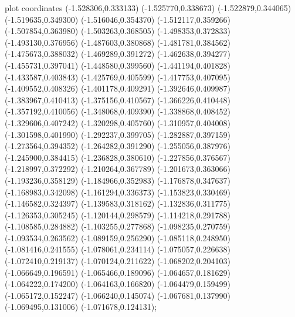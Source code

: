 { plot coordinates {(-1.528306,0.333133) (-1.525770,0.338673) (-1.522879,0.344065) (-1.519635,0.349300) (-1.516046,0.354370) (-1.512117,0.359266) (-1.507854,0.363980) (-1.503263,0.368505) (-1.498353,0.372833) (-1.493130,0.376956) (-1.487603,0.380868) (-1.481781,0.384562) (-1.475673,0.388032) (-1.469289,0.391272) (-1.462638,0.394277) (-1.455731,0.397041) (-1.448580,0.399560) (-1.441194,0.401828) (-1.433587,0.403843) (-1.425769,0.405599) (-1.417753,0.407095) (-1.409552,0.408326) (-1.401178,0.409291) (-1.392646,0.409987) (-1.383967,0.410413) (-1.375156,0.410567) (-1.366226,0.410448) (-1.357192,0.410056) (-1.348068,0.409390) (-1.338868,0.408452) (-1.329606,0.407242) (-1.320298,0.405760) (-1.310957,0.404008) (-1.301598,0.401990) (-1.292237,0.399705) (-1.282887,0.397159) (-1.273564,0.394352) (-1.264282,0.391290) (-1.255056,0.387976) (-1.245900,0.384415) (-1.236828,0.380610) (-1.227856,0.376567) (-1.218997,0.372292) (-1.210264,0.367789) (-1.201673,0.363066) (-1.193236,0.358129) (-1.184966,0.352983) (-1.176878,0.347637) (-1.168983,0.342098) (-1.161294,0.336373) (-1.153823,0.330469) (-1.146582,0.324397) (-1.139583,0.318162) (-1.132836,0.311775) (-1.126353,0.305245) (-1.120144,0.298579) (-1.114218,0.291788) (-1.108585,0.284882) (-1.103255,0.277868) (-1.098235,0.270759) (-1.093534,0.263562) (-1.089159,0.256290) (-1.085118,0.248950) (-1.081416,0.241555) (-1.078061,0.234114) (-1.075057,0.226638) (-1.072410,0.219137) (-1.070124,0.211622) (-1.068202,0.204103) (-1.066649,0.196591) (-1.065466,0.189096) (-1.064657,0.181629) (-1.064222,0.174200) (-1.064163,0.166820) (-1.064479,0.159499) (-1.065172,0.152247) (-1.066240,0.145074) (-1.067681,0.137990) (-1.069495,0.131006) (-1.071678,0.124131)};
}

